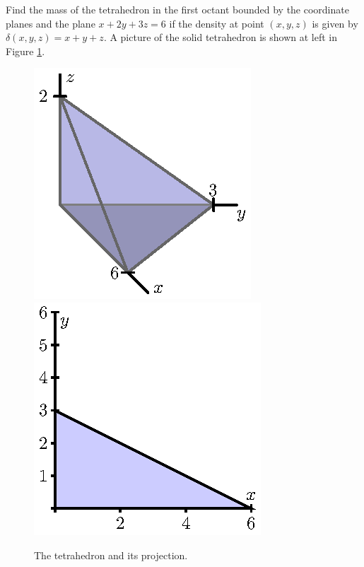 \begin{example} \label{ex:11.7.Tetrahedron_mass} Find the mass of the tetrahedron in the first octant bounded by the coordinate planes and the plane $x + 2 y + 3 z = 6$ if the density at point $(x,y,z)$ is given by $\delta(x, y, z) = x + y + z$. A picture of the solid tetrahedron is shown at left in Figure \ref{F:11.7.Tetrahedron_ex}.
\begin{figure}[ht]
\begin{center}
  \includegraphics{figures/fig_11_7_tetrahedron.eps}
\hspace{1.0in}
  \includegraphics{figures/fig_11_7_tetrahedron_project.eps}
\caption{The tetrahedron and its projection.}
\label{F:11.7.Tetrahedron_ex}
\end{center}
\end{figure}


\end{example}
